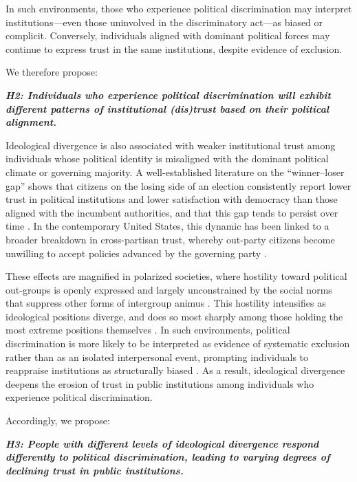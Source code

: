 \documentclass{article}
\begin{document}
In such environments, those who experience political discrimination may interpret institutions—even those uninvolved in the discriminatory act—as biased or complicit. Conversely, individuals aligned with dominant political forces may continue to express trust in the same institutions, despite evidence of exclusion.

We therefore propose:

\emph{\textbf{\small
H2: Individuals who experience political discrimination will exhibit different patterns of institutional (dis)trust based on their political alignment.
}}

Ideological divergence is also associated with weaker institutional trust among individuals whose political identity is misaligned with the dominant political climate or governing majority. A well-established literature on the ``winner--loser gap'' shows that citizens on the losing side of an election consistently report lower trust in political institutions and lower satisfaction with democracy than those aligned with the incumbent authorities, and that this gap tends to persist over time \parencite{anderson_political_1997, anderson_losers_2005}. In the contemporary United States, this dynamic has been linked to a broader breakdown in cross-partisan trust, whereby out-party citizens become unwilling to accept policies advanced by the governing party \parencite{hetherington_why_2015}.

These effects are magnified in polarized societies, where hostility toward political out-groups is openly expressed and largely unconstrained by the social norms that suppress other forms of intergroup animus \parencite{iyengar_fear_2015}. This hostility intensifies as ideological positions diverge, and does so most sharply among those holding the most extreme positions themselves \parencite{rogowski_how_2016}. In such environments, political discrimination is more likely to be interpreted as evidence of systematic exclusion rather than as an isolated interpersonal event, prompting individuals to reappraise institutions as structurally biased \parencite{oskooii_perceived_2020}. As a result, ideological divergence deepens the erosion of trust in public institutions among individuals who experience political discrimination.

Accordingly, we propose:

\emph{\textbf{\small
H3: People with different levels of ideological divergence respond differently to political discrimination, leading to varying degrees of declining trust in public institutions.
}}
\end{document}
